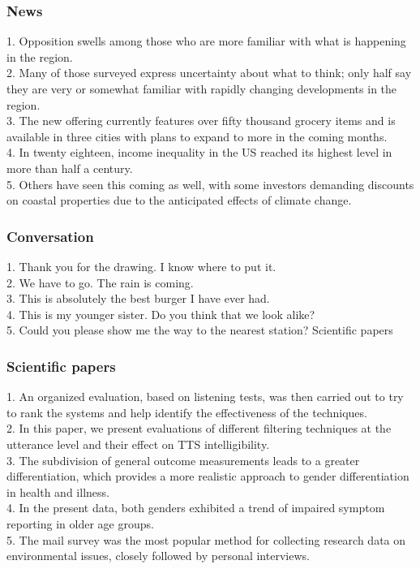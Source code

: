 \documentclass[12pt]{article}
\begin{document}
\subsubsection{News}
1.	Opposition swells among those who are more familiar with what is happening in the region.\\
2.	Many of those surveyed express uncertainty about what to think; only half say they are very or somewhat familiar with rapidly changing developments in the region.\\
3.	The new offering currently features over fifty thousand grocery items and is available in three cities with plans to expand to more in the coming months.\\
4.	In twenty eighteen, income inequality in the US reached its highest level in more than half a century.\\
5.	Others have seen this coming as well, with some investors demanding discounts on coastal properties due to the anticipated effects of climate change.

\subsubsection{Conversation}
1.	Thank you for the drawing. I know where to put it.\\
2.	We have to go. The rain is coming.\\
3.	This is absolutely the best burger I have ever had.\\
4.	This is my younger sister. Do you think that we look alike?\\
5.	Could you please show me the way to the nearest station?
Scientific papers

\subsubsection{Scientific papers}
1.	An organized evaluation, based on listening tests, was then carried out to try to rank the systems and help identify the effectiveness of the techniques.\\
2.	In this paper, we present evaluations of different filtering techniques at the utterance level and their effect on TTS intelligibility.\\
3.	The subdivision of general outcome measurements leads to a greater differentiation, which provides a more realistic approach to gender differentiation in health and illness.\\
4.	In the present data, both genders exhibited a trend of impaired symptom reporting in older age groups.\\
5.	The mail survey was the most popular method for collecting research data on environmental issues, closely followed by personal interviews.
\end{document}
